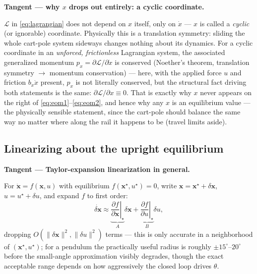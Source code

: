 \documentclass[11pt]{article}
\newenvironment{tangent}[1]{%
  \par\smallskip\noindent\hrulefill\par
  \noindent\textbf{Tangent — #1.}\par\smallskip
  \begingroup\itshape
}{%
  \endgroup
  \par\noindent\hrulefill\par\smallskip
}
\newcommand{\mb}[1]{\mathbf{#1}}
\begin{document}
\begin{tangent}{why $x$ drops out entirely: a cyclic coordinate}
$\mathcal L$ in \eqref{eq:lagrangian} does not depend on $x$ itself, only
on $\dot x$ — $x$ is called a \emph{cyclic} (or ignorable) coordinate.
Physically this is a translation symmetry: sliding the whole cart-pole
system sideways changes nothing about its dynamics. For a cyclic
coordinate in an \emph{unforced, frictionless} Lagrangian system, the
associated generalized momentum $p_x = \partial\mathcal L/\partial\dot x$
is conserved (Noether's theorem, translation symmetry $\to$ momentum
conservation) — here, with the applied force $u$ and friction $b_x\dot x$
present, $p_x$ is not literally conserved, but the structural fact driving
both statements is the same: $\partial\mathcal L/\partial x \equiv 0$.
That is exactly why $x$ never appears on the right of
\eqref{eq:eom1}--\eqref{eq:eom2}, and hence why any $x$ is an equilibrium
value — the physically sensible statement, since the cart-pole should
balance the same way no matter where along the rail it happens to be
(travel limits aside).
\end{tangent}

\subsection{Linearizing about the upright equilibrium}

\begin{tangent}{Taylor-expansion linearization in general}
For $\dot{\mb x} = f(\mb x,u)$ with equilibrium $f(\mb x^\star,u^\star)=0$,
write $\mb x = \mb x^\star+\delta\mb x$, $u=u^\star+\delta u$, and expand
$f$ to first order:
\[
  \dot{\delta\mb x} \approx \underbrace{\left.\frac{\partial f}{\partial
  \mb x}\right|_{\star}}_{A}\delta\mb x +
  \underbrace{\left.\frac{\partial f}{\partial u}\right|_{\star}}_{B}
  \delta u,
\]
dropping $O(\|\delta\mb x\|^2,\|\delta u\|^2)$ terms — this is only
accurate in a neighborhood of $(\mb x^\star,u^\star)$; for a pendulum the
practically useful radius is roughly $\pm 15^\circ$–$20^\circ$ before the
small-angle approximation visibly degrades, though the exact acceptable
range depends on how aggressively the closed loop drives $\theta$.
\end{tangent}
\end{document}
